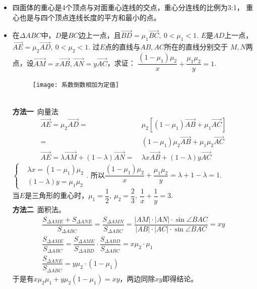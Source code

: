 \begin{itemize}[leftmargin=\inteval{\myitemleftmargin}pt,itemsep=
   \inteval{\myitemitempsep}pt,topsep=\inteval{\myitemtopsep}pt]
\item 四面体的重心是4个顶点与对面重心连线的交点，重心分连线的比例为3:1，
重心也是与四个顶点连线长度的平方和最小的点。

\item 在$ \Delta ABC $中，$ D $是$ BC $边上一点，且$ \vec{BD}=\mu_1
\vec{BC},\ 0<\mu_1<1 $. $ E $是$ AD $上一点，$ \vec{AE} =
\mu_2\vec{AD},\ 0<\mu_2<1 $. 过$ E $点的直线与$ AB,AC $所在的直线分别交于
$ M,N $两点，设$ \vec{AM}=x\vec{AB},\vec{AN}=
y\vec{AC} $，求证：
$ \dfrac{(1-\mu_1)\mu_2}{x}+\dfrac{\mu_1\mu_2}{y}=1 $. 
\begin{figure}[h]
    \centering
    \texttt{[image: 系数倒数相加为定值]}
\end{figure} \\
\textbf{方法一}\ 向量法
\begin{align*}
    \vec{AE} =\mu_2\vec{AD} =&\ \mu_2\left[
    (1-\mu_1)\vec{AB}+\mu_1\vec{AC}\right]\\
    =&\ (1-\mu_1)\mu_2\vec{AB}+\mu_1\mu_2\vec{AC} \\
    \vec{AE}=\lambda\vec{AM}+(1-\lambda)
    \vec{AN}=&\ \lambda x\vec{AB}+(1-\lambda)y
    \vec{AC}
\end{align*}
$ \begin{cases}
    &\lambda x = (1-\mu_1)\mu_2 \\
    &(1-\lambda)y = \mu_1\mu_2
\end{cases} $. 所以$ \dfrac{(1-\mu_1)\mu_2}{x}+\dfrac{\mu_1\mu_2}{y}
=\lambda+1-\lambda=1 $. \\
当$ E $是三角形的重心时，$ \mu_1=\dfrac{1}{2},\ \mu_2=\dfrac{2}{3},\ 
\dfrac{1}{x}+\dfrac{1}{y}=3 $. \\
\textbf{方法二}\ 面积法。
\begin{gather*}
    \dfrac{S_{\Delta AME}+S_{\Delta ANE}}{S_{\Delta ABC}}=
    \dfrac{S_{\Delta AMN}}{S_{\Delta ABC}}=\dfrac{|AM|\cdot 
    |AN|\cdot\sin\angle BAC}
    {|AB|\cdot |AC|\cdot\sin\angle BAC}=xy \\
    \dfrac{S_{\Delta AME}}{S_{\Delta ABC}}=\dfrac{S_{\Delta AME}}
    {S_{\Delta ABD}}\cdot \dfrac{S_{\Delta ABD}}{S_{\Delta ABC}}=x\mu_2\cdot\mu_1 \\
    \dfrac{S_{\Delta ANE}}{S_{\Delta ABC}}=y\mu_2\cdot(1-\mu_1)
\end{gather*}
于是有$ x\mu_2\mu_1+y\mu_2(1-\mu_1)=xy $，两边同除$ xy $即得结论。


\end{itemize}
